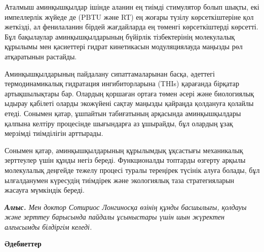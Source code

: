 \begin{multicols}{2}
Аталмыш аминқышқылдар ішінде аланин ең тиімді стимулятор болып шықты,
екі импеллерлік жүйеде де (PBTU және RT) ең жоғары түзілу
көрсеткіштеріне қол жеткізді, ал фенилаланин бірдей жағдайларда ең
төменгі көрсеткіштерді көрсетті. Бұл бақылаулар аминқышқылдарының
бүйірлік тізбектерінің молекулалық құрылымы мен қасиеттері гидрат
кинетикасын модуляциялауда маңызды рөл атқаратынын растайды.

Аминқышқылдарының пайдалану сипаттамаларынан басқа, әдеттегі
термодинамикалық гидратация ингибиторларына (THIs) қарағанда бірқатар
артықшылықтары бар. Олардың қоршаған ортаға төмен әсері және биологиялық
ыдырау қабілеті оларды экожүйені сақтау маңызды қайраңда қолдануға
қолайлы етеді. Сонымен қатар, ұшпайтын табиғатының арқасында
аминқышқылдары қалпына келтіру процесінде шығындарға аз ұшырайды, бұл
олардың ұзақ мерзімді тиімділігін арттырады.

Сонымен қатар, аминқышқылдарының құрылымдық ұқсастығы механикалық
зерттеулер үшін құнды негіз береді. Функционалды топтарды өзгерту арқылы
молекулалық деңгейде тежелу процесі туралы тереңірек түсінік алуға
болады, бұл ылғалданумен күресудің тиімдірек және экологиялық таза
стратегияларын жасауға мүмкіндік береді.

\emph{{\bfseries Алғыс.} Мен доктор Сотириос Лонгиносқа өзінің құнды
басшылығы, қолдауы және зерттеу барысында пайдалы ұсыныстары үшін шын
жүректен алғысымды білдіргім келеді.}
\end{multicols}

\begin{center}
{\bfseries Әдебиеттер}
\end{center}

